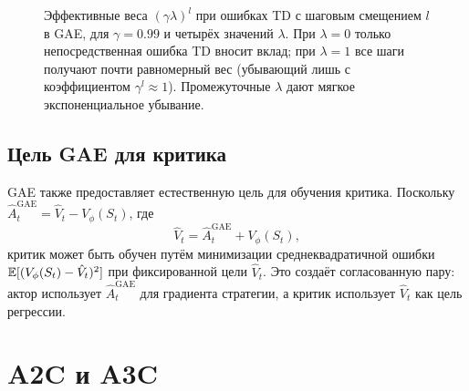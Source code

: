 \begin{figure}[ht]
\caption{Эффективные веса $(\gamma\lambda)^l$ при ошибках TD с шаговым смещением $l$ в GAE, для $\gamma = 0.99$ и четырёх значений $\lambda$. При $\lambda=0$ только непосредственная ошибка TD вносит вклад; при $\lambda=1$ все шаги получают почти равномерный вес (убывающий лишь с коэффициентом $\gamma^l \approx 1$). Промежуточные $\lambda$ дают мягкое экспоненциальное убывание.}
\label{fig:gae-lambda}
\end{figure}

\subsection{Цель GAE для критика}

GAE также предоставляет естественную цель для обучения критика. Поскольку $\hat{A}_t^{\mathrm{GAE}} = \hat{V}_t - V_\phi(S_t)$, где
\begin{equation}
\label{eq:gae-vtarget}
\hat{V}_t = \hat{A}_t^{\mathrm{GAE}} + V_\phi(S_t),
\end{equation}
критик может быть обучен путём минимизации среднеквадратичной ошибки $\operatorname{\mathbb{E}}[(V_\phi(S_t) - \hat{V}_t)^2]$ при фиксированной цели $\hat{V}_t$. Это создаёт согласованную пару: актор использует $\hat{A}_t^{\mathrm{GAE}}$ для градиента стратегии, а критик использует $\hat{V}_t$ как цель регрессии.

\section{A2C и A3C}
\label{sec:a3c}

